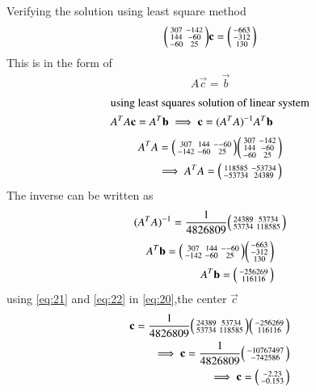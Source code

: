 \documentclass[journal,12pt,twocolumn]{IEEEtran}
\begin{document}
Verifying the solution using least square method  
\begin{align}
	\myvec{307& -142 \\ 144 & -60 \\  -60 & 25 }\vec{c}=\myvec{-663 \\ -312\\ 130} 
\end{align}
This is in the form of 
\begin{align}
 {A}\vec{c}=\vec{b}
 \end{align}
  \begin{align} 
 \intertext{using least squares solution of linear system}
 {A}^T{A}\vec{c}={A}^T\vec{b}
 \implies \vec{c}=  ({{A}^T{A}})^{-1} {A}^T\vec{b} \label{eq:20}
\end{align}
\begin{align}
{A}^T{A}=\myvec{307 & 144 & --60 \\ -142& -60& 25 }
 \myvec{307& -142 \\ 144 & -60 \\  -60 & 25 } \nonumber \\ \implies
 {A}^T{A}=\myvec{118585& -53734 \\  -53734 & 24389 }
\end{align}
The inverse can be written as
\begin{align}
    ({{A}^T{A}})^{-1}=\frac{1}{4826809}
    \myvec{24389&53734 \\  53734 & 118585}\label{eq:21}
\end{align} 
\begin{align}
   {A}^T\vec{b} = \myvec{307 & 144 & --60 \\ -142& -60& 25 }\myvec{-663 \\ -312 \\ 130} \nonumber \\
   {A}^T\vec{b} =\myvec{-256269 \\ 116116} \label{eq:22}
\end{align}
using \ref{eq:21} and \ref{eq:22} in \ref{eq:20},the center $\vec{c}$
\begin{align}
    \vec{c}=\frac{1}{4826809}
    \myvec{24389&53734 \\  53734 & 118585}\myvec{-256269 \\ 116116} \\
    \implies \vec{c}=\frac{1}{4826809}\myvec{-10767497 \\ -742586}\\
    \implies \vec{c}=\myvec{-2.23 \\ -0.153}  
\end{align}
\end{document}
